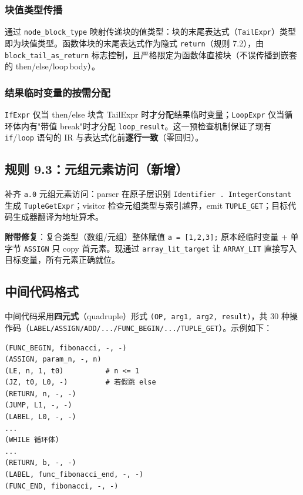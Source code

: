 \documentclass[12pt,a4paper]{ctexart}
\begin{document}
\subsubsection{块值类型传播}

通过 \texttt{node\_block\_type} 映射传递块的值类型：块的末尾表达式（\texttt{TailExpr}）类型即为块值类型。函数体块的末尾表达式作为隐式 \texttt{return}（规则 7.2），由 \texttt{block\_tail\_as\_return} 标志控制，且严格限定为函数体直接块（不误传播到嵌套的 then/else/loop\,body）。

\subsubsection{结果临时变量的按需分配}

\texttt{IfExpr} 仅当 then/else 块含 TailExpr 时才分配结果临时变量；\texttt{LoopExpr} 仅当循环体内有"带值 break"时才分配 \texttt{loop\_result}。这一预检查机制保证了现有 \texttt{if}/\texttt{loop} 语句的 IR 与表达式化前\textbf{逐行一致}（零回归）。

\subsection{规则 9.3：元组元素访问（新增）}

补齐 \texttt{a.0} 元组元素访问：parser 在原子层识别 \texttt{Identifier . IntegerConstant} 生成 \texttt{TupleGetExpr}；visitor 检查元组类型与索引越界，emit \texttt{TUPLE\_GET}；目标代码生成器翻译为地址算术。

\textbf{附带修复}：复合类型（数组/元组）整体赋值 \texttt{a = [1,2,3];} 原本经临时变量 + 单字节 \texttt{ASSIGN} 只 copy 首元素。现通过 \texttt{array\_lit\_target} 让 \texttt{ARRAY\_LIT} 直接写入目标变量，所有元素正确就位。

\subsection{中间代码格式}

中间代码采用\textbf{四元式}（quadruple）形式 \texttt{(OP, arg1, arg2, result)}，共 30 种操作码（\texttt{LABEL/ASSIGN/ADD/.../FUNC\_BEGIN/.../TUPLE\_GET}）。示例如下：

\begin{lstlisting}[caption={fibonacci 函数的四元式 IR（节选）}]
(FUNC_BEGIN, fibonacci, -, -)
(ASSIGN, param_n, -, n)
(LE, n, 1, t0)          # n <= 1
(JZ, t0, L0, -)         # 若假跳 else
(RETURN, n, -, -)
(JUMP, L1, -, -)
(LABEL, L0, -, -)
...
(WHILE 循环体)
...
(RETURN, b, -, -)
(LABEL, func_fibonacci_end, -, -)
(FUNC_END, fibonacci, -, -)
\end{lstlisting}
\end{document}
